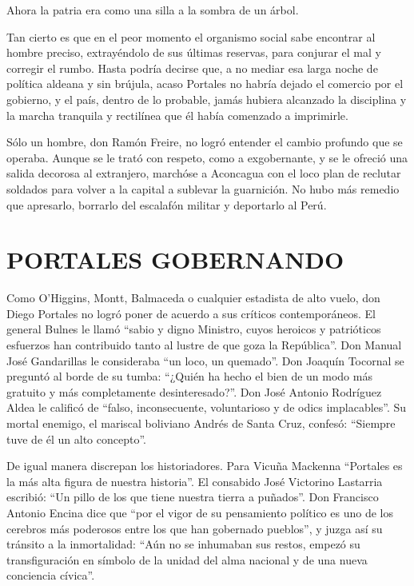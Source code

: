 \documentclass[10pt,twoside,openright]{memoir}
\begin{document}
Ahora la patria era como una silla a la sombra de un árbol.

Tan cierto es que en el peor momento el organismo social sabe encontrar
al hombre preciso, extrayéndolo de sus últimas reservas, para conjurar
el mal y corregir el rumbo. Hasta podría decirse que, a no mediar esa
larga noche de política aldeana y sin brújula, acaso Portales no habría
dejado el comercio por el gobierno, y el país, dentro de lo probable,
jamás hubiera alcanzado la disciplina y la marcha tranquila y rectilínea
que él había comenzado a imprimirle.

Sólo un hombre, don Ramón Freire, no logró entender el cambio profundo
que se operaba. Aunque se le trató
con respeto, como a exgobernante, y se le ofreció una salida decorosa al
extranjero, marchóse a Aconcagua con el loco plan de reclutar soldados
para volver a la capital a sublevar la guarnición. No hubo más remedio
que apresarlo, borrarlo del escalafón militar y deportarlo al Perú.

\chapter{PORTALES GOBERNANDO}

Como O'Higgins, Montt, Balmaceda o cualquier estadista de alto vuelo, don
Diego Portales no logró poner de acuerdo a sus críticos contemporáneos.
El general Bulnes le llamó ``sabio y digno Ministro, cuyos heroicos y
patrióticos esfuerzos han contribuido tanto al lustre de que goza la
República''. Don Manual José Gandarillas le consideraba ``un loco, un
quemado''. Don Joaquín Tocornal se preguntó al borde de su tumba: ``¿Quién
ha hecho el bien de un modo más gratuito y más completamente
desinteresado?''. Don José Antonio Rodríguez Aldea le calificó de ``falso,
inconsecuente, voluntarioso y de odics implacables''. Su mortal enemigo,
el mariscal boliviano Andrés de Santa Cruz, confesó: ``Siempre tuve de él
un alto concepto''. 

De igual manera discrepan los historiadores. Para Vicuña Mackenna
``Portales es la más alta figura de
nuestra historia''. El consabido José Victorino Lastarria escribió: ``Un
pillo de los que tiene nuestra tierra a puñados''. Don Francisco Antonio Encina
dice que ``por el vigor de su pensamiento político es uno de los cerebros más
poderosos entre los que han gobernado pueblos'', y juzga así su tránsito a la
inmortalidad: ``Aún no se inhumaban sus restos, empezó su transfiguración en símbolo 
de la unidad del  alma nacional y de una nueva conciencia cívica''.
\end{document}
